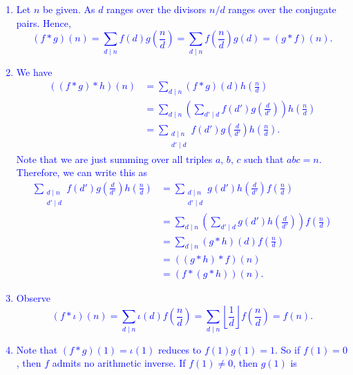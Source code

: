 \documentclass[a4paper,11pt]{article}
\theoremstyle{mythm}
\theoremstyle{mydef}
\newcommand{\blue}[1]{\textcolor{blue}{#1}}
\begin{document}
\blue{
  \begin{enumerate}[{\bf (a)}]
  \item Let $n$ be given. As $d$ ranges over the divisors $n/d$ ranges over the
    conjugate pairs. Hence,
    \[
      (f*g)(n) = \sum_{d \mid n}f(d)g\left( \frac{n}{d} \right)
      = \sum_{d \mid n}f\left( \frac{n}{d} \right)g(d) = (g*f)(n).
    \]
  \item We have
    \begin{align*}
      ((f*g)*h)(n) &= \sum_{d \mid n}(f*g)(d)h\left( \frac{n}{d} \right) \\
      &= \sum_{d \mid n}\left( \sum_{d' \mid d}f(d')g\left( \frac{d}{d'} \right) \right)h\left( \frac{n}{d} \right) \\
      &= \sum_{\begin{smallmatrix}d \mid n \\ d' \mid d\end{smallmatrix}}f(d')g\left( \frac{d}{d'} \right)h\left( \frac{n}{d} \right).
    \end{align*}
    Note that we are just summing over all triples $a,\,b,\,c$ such that
    $abc=n$. Therefore, we can write this as
    \begin{align*}
      \sum_{\begin{smallmatrix}d \mid n \\ d' \mid d\end{smallmatrix}}f(d')g\left( \frac{d}{d'} \right)h\left( \frac{n}{d} \right) &= \sum_{\begin{smallmatrix}d \mid n \\ d' \mid d\end{smallmatrix}}g(d')h\left( \frac{d}{d'} \right)f\left( \frac{n}{d} \right) \\
      &= \sum_{d \mid n}\left( \sum_{d' \mid d} g(d')h\left( \frac{d}{d'} \right) \right)f\left( \frac{n}{d} \right) \\
      &= \sum_{d \mid n}(g*h)(d)f\left( \frac{n}{d} \right) \\
      &= ((g*h)*f)(n) \\
      &= (f*(g*h))(n).
    \end{align*}
  \item Observe
    \[
      (f*\iota)(n)=\sum_{d \mid n}\iota(d)f\left( \frac{n}{d} \right) =
      \sum_{d \mid n}\left\lfloor \frac{1}{d} \right\rfloor f\left( \frac{n}{d}
      \right) = f(n).
    \]
  \item Note that $(f*g)(1)=\iota(1)$ reduces to $f(1)g(1)=1$. So if $f(1)=0$,
    then $f$ admits no arithmetic inverse. If $f(1) \neq 0$, then $g(1)$ is

\end{enumerate}}
\end{document}

